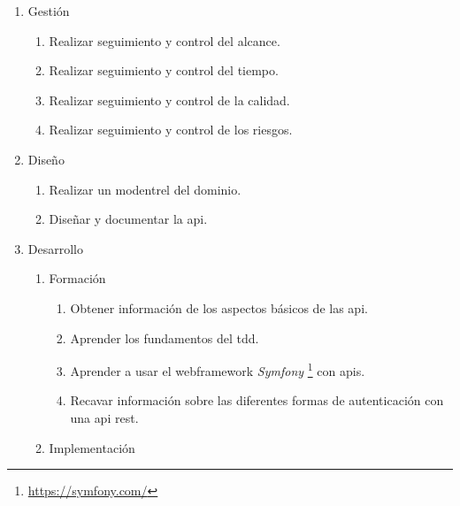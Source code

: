 \begin{enumerate}
\begin{enumerate}
\begin{enumerate}
    \end{enumerate}

  \end{enumerate}

  \item Gestión
  \label{item:gestion}

  \begin{enumerate}

    \item Realizar seguimiento y control del alcance.
    \item Realizar seguimiento y control del tiempo.
    \item Realizar seguimiento y control de la calidad.
    \item Realizar seguimiento y control de los riesgos.

  \end{enumerate}

  \item Diseño
  \label{item:diseno}

  \begin{enumerate}

    \item Realizar un \gls{modentrel} del dominio.
    \item Diseñar y documentar la \gls{api}. \label{item:disdocapi}

  \end{enumerate}

  \item Desarrollo

  \begin{enumerate}

    \item Formación

    \begin{enumerate}

      \item Obtener información de los aspectos básicos de las \gls{api}.
      \item Aprender los fundamentos del \gls{tdd}.
      \item Aprender a usar el \gls{webframework} \textit{Symfony}
        \footnote{\url{https://symfony.com/}} con \gls{api}s.
      \item Recavar información sobre las diferentes formas de autenticación
        con una \gls{api} \gls{rest}.

    \end{enumerate}
 
    \item Implementación


\end{enumerate}
\end{enumerate}
